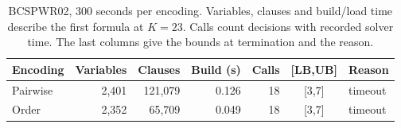 \begin{table}[htbp]\centering\small
\caption{BCSPWR02, 300 seconds per encoding. Variables, clauses and build/load time describe the first formula at $K=23$. Calls count decisions with recorded solver time. The last columns give the bounds at termination and the reason.}
\label{tab:larger}\begin{tabular}{lrrrrcl}\hline
Encoding & Variables & Clauses & Build (s) & Calls & [LB,UB] & Reason\\\hline
Pairwise & 2,401 & 121,079 & 0.126 & 18 & [3,7] & timeout\\
Order & 2,352 & 65,709 & 0.049 & 18 & [3,7] & timeout\\
\hline\end{tabular}\end{table}
